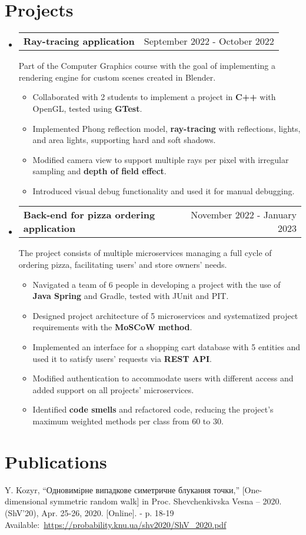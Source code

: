 \documentclass[a4paper,21pt]{article}
\makeatletter
\newcommand{\resumeSubheadingLess}[3]{
  \vspace{-1pt}\item\normalsize
    \begin{tabular*}{0.97\textwidth}{l@{\extracolsep{\fill}}r}
      \textbf{#1} & #2 \\
    \end{tabular*}
    \vspace{0pt}
    \small{\newline #3}
    \vspace{-4pt}
}
\newcommand{\subItemOfItem}[1]{
    \item\small {#1}\vspace{-2pt}
}
\newcommand{\resumeSubHeadingListStart}{\begin{itemize}[leftmargin=*]}
\newcommand{\resumeSubHeadingListEnd}{\end{itemize}}
\newcommand{\resumeItemListStart}{\begin{itemize}}
\newcommand{\resumeItemListEnd}{\end{itemize}\vspace{-5pt}}
\makeatother
\begin{document}
\section{Projects}
\resumeSubHeadingListStart
\resumeSubheadingLess{Ray-tracing application}{September 2022 - October 2022}{Part of the Computer Graphics course with the goal of implementing a rendering engine for custom scenes created in Blender.}
    \resumeItemListStart
        \subItemOfItem{Collaborated with 2 students to implement a project in \textbf{C++} with OpenGL, tested using \textbf{GTest}.}
        \subItemOfItem
        {Implemented Phong reflection model, \textbf{ray-tracing} with reflections, lights, and area lights, supporting hard and soft shadows.}
        \subItemOfItem
        {Modified camera view to support multiple rays per pixel with irregular sampling and \textbf{depth of field effect}.}
        \subItemOfItem
        {Introduced visual debug functionality and used it for manual debugging.}
    \resumeItemListEnd
\resumeSubheadingLess{Back-end for pizza ordering application}{November 2022 - January 2023}{The project consists of multiple microservices managing a full cycle of ordering pizza, facilitating users’ and store owners’ needs.}
    \resumeItemListStart
        \subItemOfItem
        {Navigated a team of 6 people in developing a project with the use of \textbf{Java Spring} and Gradle, tested with JUnit and PIT.}
        \subItemOfItem
        {Designed project architecture of 5 microservices and systematized project requirements with the \textbf{MoSCoW method}.}
        \subItemOfItem
        {Implemented an interface for a shopping cart database with 5 entities and used it to satisfy users’ requests via \textbf{REST API}.}
        \subItemOfItem
        {Modified authentication to accommodate users with different access and added support on all projects' microservices.}
        \subItemOfItem
        {Identified \textbf{code smells} and refactored code, reducing the project's maximum weighted methods per class from 60 to 30.}
    \resumeItemListEnd
\resumeSubHeadingListEnd

\vspace{-5pt}
\section{Publications}
\begin{description}[font=$\bullet$]
\item {Y. Kozyr, “Одновимiрне випадкове симетричне блукання точки,” [One-dimensional symmetric random walk] in Proc. Shevchenkivska Vesna – 2020. (ShV’20), Apr. 25-26, 2020. [Online]. - p. 18-19 Available:~\href{https://probability.knu.ua/shv2020/ShV_2020.pdf}{https://probability.knu.ua/shv2020/ShV\_2020.pdf}}
\end{description}
\end{document}
